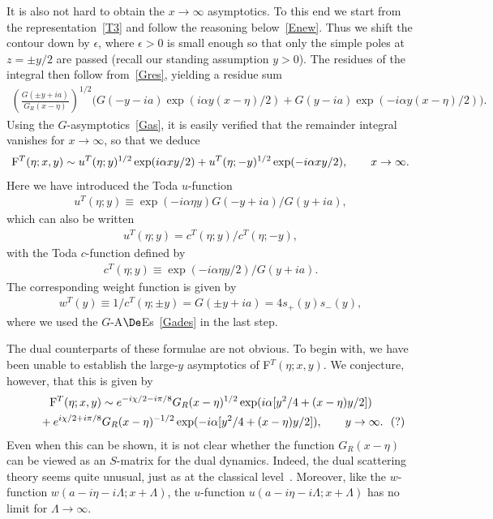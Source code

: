 \documentclass[pdftex]{sigma}
\numberwithin{equation}{section}
\begin{document}
It is also not hard to obtain the $x\to\infty$ asymptotics. To this end we start from the representation~\eqref{T3} and follow the reasoning below~\eqref{Enew}. Thus we shift the contour down by $\epsilon$, where $\epsilon>0$ is small enough so that only the simple poles at $z=\pm y/2$ are passed (recall our standing assumption $y>0$). The residues of the integral then follow from~\eqref{Gres}, yielding a residue sum
\begin{gather}
\left(\frac{G(\pm y+ia)}{G_R(x-\eta)}\right)^{1/2}\!\!\big(G(-y-ia)\exp(i\alpha y(x-\eta)/2) +
G(y-ia)\exp(-i\alpha y(x-\eta)/2)\big).\!\!\!
\end{gather}
Using the $G$-asymptotics~\eqref{Gas}, it is easily verif\/ied that the remainder integral vanishes for $x\to\infty$, so that we deduce
\begin{gather}
{\rm F}^T(\eta;x,y)\sim u^T(\eta;y)^{1/2}\exp(i\alpha xy/2)+
u^T(\eta;-y)^{1/2}\exp(-i\alpha xy/2),\qquad x\to\infty.
\end{gather}
Here we have introduced the Toda $u$-function
\begin{gather}
u^T(\eta;y)\equiv \exp(-i\alpha \eta y)G(-y+ia)/G(y+ia),
\end{gather}
which can also be written
\begin{gather}
u^T(\eta;y)=c^T(\eta;y)/c^T(\eta;-y),
\end{gather}
with the Toda $c$-function def\/ined by
\begin{gather}
c^T(\eta;y)\equiv \exp(-i\alpha \eta y/2)/G(y+ia).
\end{gather}
The corresponding weight function is given by
\begin{gather}\label{wTy}
w^T(y)\equiv 1/c^T(\eta;\pm y)=G(\pm y+ia)=4s_+(y)s_-(y),
\end{gather}
where we used the $G$-A$\De$Es~\eqref{Gades} in the last step.

The dual counterparts of these formulae are not obvious. To begin with, we have been unable to establish the large-$y$ asymptotics of F$^T(\eta;x,y)$. We conjecture, however, that this is given by
\begin{gather}
  {\rm F}^T(\eta;x,y)  \sim  e^{-i\chi/2-i\pi/8}G_R(x-\eta)^{1/2}\exp(i\alpha[y^2/4+ (x-\eta)y/2])
 \nonumber\\
\qquad{}   +
e^{i\chi/2+i\pi/8}G_R(x-\eta)^{-1/2}\exp(-i\alpha[y^2/4+ (x-\eta)y/2]),\qquad y\to\infty.\ \ (?)\label{yas}
\end{gather}
Even when this can be shown, it is not clear whether the function $G_R(x-\eta)$ can be viewed as an $S$-matrix for the dual dynamics. Indeed, the dual scattering theory seems quite unusual, just as at the classical level~\cite{toda}. Moreover, like the $w$-function  $w(a-i\eta-i\Lambda;x+\Lambda)$, the $u$-function $u(a-i\eta-i\Lambda;x+\Lambda)$ has no limit for $\Lambda\to \infty$.
\end{document}
